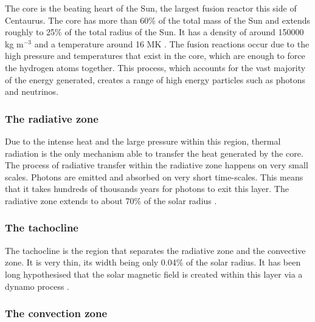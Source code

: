     The core is the beating heart of the Sun, the largest fusion reactor this side of Centaurus.
    The core has more than 60\% of the total mass of the Sun and extends roughly to 25\% of the total radius of the Sun.
    It has a density of around 150000 kg m$^{-3}$ and a temperature around 16 MK \citep{0004-637X-699-2-1403}.
    The fusion reactions occur due to the high pressure and temperatures that exist in the core, which are enough to force the hydrogen atoms together. 
    This process, which accounts for the vast majority of the energy generated, creates a range of high energy particles such as photons and neutrinos.
    
\subsubsection{The radiative zone}

    Due to the intense heat and the large pressure within this region, thermal radiation is the only mechanism able to transfer the heat generated by the core.
    The process of radiative transfer within the radiative zone happens on very small scales.
    Photons are emitted and absorbed on very short time-scales. 
    This means that it takes hundreds of thousands years for photons to exit this layer.
    The radiative zone extends to about 70\% of the solar radius \citep{cox1991solar}. 
        
\subsubsection{The tachocline}

    The tachocline is the region that separates the radiative zone and the convective zone.
    It is very thin, its width being only 0.04\% of the solar radius.
    It has been long hypothesised that the solar magnetic field is created within this layer via a dynamo process \citep{stix2004sun,soward2005fluid}.

\subsubsection{The convection zone}

